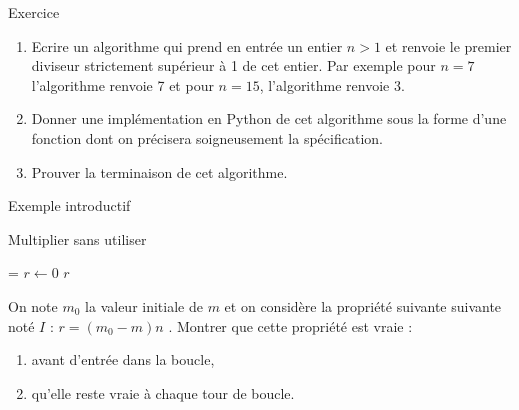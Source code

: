 \documentclass[10pt,french]{beamer}
\begin{document}
\begin{frame}{\Ctitle}{\stitle}
	\begin{exampleblock}{Exercice}
		\begin{enumerate}
			\item<1-> Ecrire un algorithme qui prend en entrée un entier $n>1$ et renvoie le premier diviseur strictement supérieur à 1 de cet entier. Par exemple pour $n=7$ l'algorithme renvoie 7 et pour $n=15$, l'algorithme renvoie $3$.
			\item<2-> Donner une implémentation en Python de cet algorithme sous la forme d'une fonction dont on précisera soigneusement la spécification.
			\item<3-> Prouver la terminaison de cet algorithme.
		\end{enumerate}
	\end{exampleblock}
\end{frame}

\begin{frame}[fragile]{\Ctitle}{\stitle}
	\begin{block}{Exemple introductif}
		\SetAlFnt{\small}
		\setlength{\algomargin}{8pt}
		\begin{algorithm}[H]
			\DontPrintSemicolon
			\caption{Multiplier sans utiliser {\tt *}}
			\everypar={\footnotesize \textcolor{gray}{\nl}}
			$r \leftarrow 0$\;
			\Return $r$
		\end{algorithm}
		On note $m_0$ la valeur initiale de $m$ et on considère la propriété suivante suivante noté $I$ : \og{} $r = (m_0-m)n$ \fg{}. Montrer que cette propriété est vraie :
		\begin{enumerate}
			\item<2-> avant d'entrée dans la boucle,
			\item<3-> qu'elle reste vraie à chaque tour de boucle.
		\end{enumerate}
	\end{block}
\end{frame}
\end{document}
